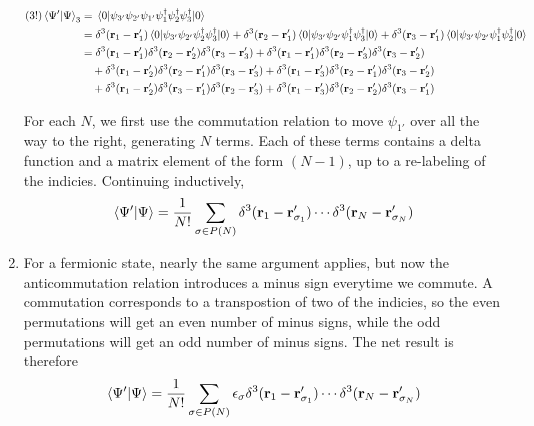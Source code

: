 \documentclass[12pt]{article}
\newcommand{\deltaDif}[2]{\delta^3(\mathbf{r}_{#1} - \mathbf{r}'_{#2})}
\begin{document}
\begin{enumerate}[label=(\alph*)]
\begin{align*}
        (3!)\braket{\Psi'}{\Psi}_3 &= \mel{0}{\psi_{3'}\psi_{2'}\psi_{1'}\psi_1^\dag\psi_2^\dag\psi_3^\dag}{0} \\
        &= \deltaDif{1}{1}\mel{0}{\psi_{3'}\psi_{2'}\psi_2^\dag\psi_3^\dag}{0} + \deltaDif{2}{1}\mel{0}{\psi_{3'}\psi_{2'}\psi_1^\dag\psi_3^\dag}{0} + \deltaDif{3}{1}\mel{0}{\psi_{3'}\psi_{2'}\psi_1^\dag\psi_2^\dag}{0} \\
        &= \deltaDif{1}{1}\deltaDif{2}{2}\deltaDif{3}{3} + \deltaDif{1}{1}\deltaDif{2}{3}\deltaDif{3}{2} \\
        &\quad + \deltaDif{1}{2}\deltaDif{2}{1}\deltaDif{3}{3} + \deltaDif{1}{3}\deltaDif{2}{1}\deltaDif{3}{2} \\
        &\quad + \deltaDif{1}{2}\deltaDif{3}{1}\deltaDif{2}{3} + \deltaDif{1}{3}\deltaDif{2}{2}\deltaDif{3}{1} 
    \end{align*}
    
    For each $N$, we first use the commutation relation to move $\psi_{1'}$ over all the way to the right, generating $N$ terms. Each of these terms contains a delta function and a matrix element of the form $(N-1)$, up to a re-labeling of the indicies. Continuing inductively,
    \[ \braket{\Psi'}{\Psi} = \frac{1}{N!}\sum_{\mathbf{\sigma}\in P(N)} \deltaDif{1}{\sigma_1}\cdots\deltaDif{N}{\sigma_N} \]

    \item For a fermionic state, nearly the same argument applies, but now the anticommutation relation introduces a minus sign everytime we commute. A commutation corresponds to a transpostion of two of the indicies, so the even permutations will get an even number of minus signs, while the odd permutations will get an odd number of minus signs. The net result is therefore
    \[ \braket{\Psi'}{\Psi} = \frac{1}{N!}\sum_{\mathbf{\sigma}\in P(N)} \epsilon_\mathbf{\sigma} \deltaDif{1}{\sigma_1}\cdots\deltaDif{N}{\sigma_N} \]  
\end{enumerate}
\end{document}
